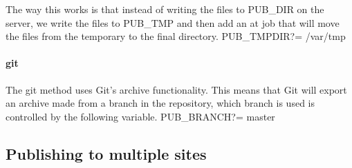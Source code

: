 The way this works is that instead of writing the files to {\Tt{}PUB{\_}DIR\nwendquote} on the 
server, we write the files to {\Tt{}PUB{\_}TMP\nwendquote} and then add an {\Tt{}at\nwendquote} job that will 
move the files from the temporary to the final directory.
\nwenddocs{}\plusendmoddef\nwstartdeflinemarkup{}\nwenddeflinemarkup
PUB_TMPDIR?=        /var/tmp
\nwendcode{}\nwdocspar

\paragraph{git}

The {\Tt{}git\nwendquote} method uses Git's archive functionality.
This means that Git will export an archive made from a branch in the 
repository, which branch is used is controlled by the following variable.
\nwenddocs{}\plusendmoddef\nwstartdeflinemarkup{}\nwenddeflinemarkup
PUB_BRANCH?=        master
\nwendcode{}\nwdocspar

\subsection{Publishing to multiple sites}

